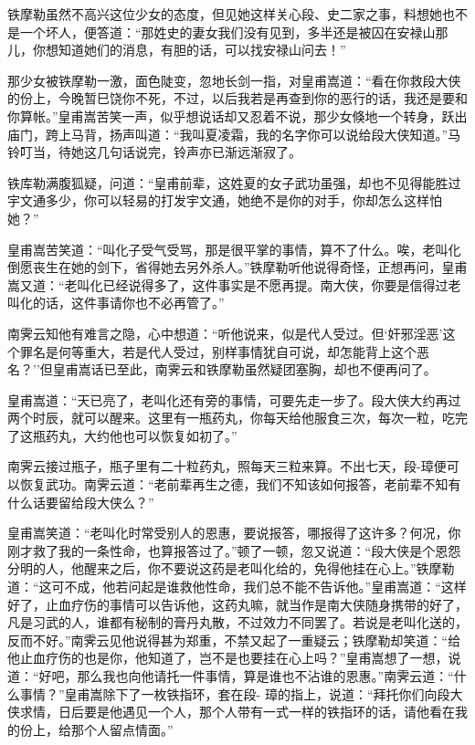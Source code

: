 \documentclass[12pt,oneside]{book}
\begin{document}
铁摩勒虽然不高兴这位少女的态度，但见她这样关心段、史二家之事，料想她也不是一个坏人，便答道：``那姓史的妻女我们没有见到，多半还是被囚在安禄山那儿，你想知道她们的消息，有胆的话，可以找安禄山问去！''

那少女被铁摩勒一激，面色陡变，忽地长剑一指，对皇甫嵩道：``看在你救段大侠的份上，今晚暂巳饶你不死，不过，以后我若是再查到你的恶行的话，我还是要和你算帐。''皇甫嵩苦笑一声，似乎想说话却又忍着不说，那少女倏地一个转身，跃出庙门，跨上马背，扬声叫道：``我叫夏凌霜，我的名字你可以说给段大侠知道。''马铃叮当，待她这几句话说完，铃声亦已渐远渐寂了。

铁库勒满腹狐疑，问道：``皇甫前辈，这姓夏的女子武功虽强，却也不见得能胜过宇文通多少，你可以轻易的打发宇文通，她绝不是你的对手，你却怎么这样怕她？''

皇甫嵩苦笑道：``叫化子受气受骂，那是很平掌的事情，算不了什么。唉，老叫化倒愿丧生在她的剑下，省得她去另外杀人。''铁摩勒听他说得奇怪，正想再问，皇甫嵩又道：``老叫化已经说得多了，这件事实是不愿再提。南大侠，你要是信得过老叫化的话，这件事请你也不必再管了。''

南霁云知他有难言之隐，心中想道：``听他说来，似是代人受过。但`奸邪淫恶'这个罪名是何等重大，若是代人受过，别样事情犹自可说，却怎能背上这个恶名？''但皇甫嵩话已至此，南霁云和铁摩勒虽然疑团塞胸，却也不便再问了。

皇甫嵩道：``天已亮了，老叫化还有旁的事情，可要先走一步了。段大侠大约再过两个时辰，就可以醒来。这里有一瓶药丸，你每天给他服食三次，每次一粒，吃完了这瓶药丸，大约他也可以恢复如初了。''

南霁云接过瓶子，瓶子里有二十粒药丸，照每天三粒来算。不出七天，段-璋便可以恢复武功。南霁云道：``老前辈再生之德，我们不知该如何报答，老前辈不知有什么话要留给段大侠么？''

皇甫嵩笑道：``老叫化时常受别人的恩惠，要说报答，哪报得了这许多？何况，你刚才救了我的一条性命，也算报答过了。''顿了一顿，忽又说道：``段大侠是个恩怨分明的人，他醒来之后，你不要说这药是老叫化给的，免得他挂在心上。''铁摩勒道：``这可不成，他若问起是谁救他性命，我们总不能不告诉他。''皇甫嵩道：``这样好了，止血疗伤的事情可以告诉他，这药丸嘛，就当作是南大侠随身携带的好了，凡是习武的人，谁都有秘制的膏丹丸散，不过效力不同罢了。若说是老叫化送的，反而不好。''南霁云见他说得甚为郑重，不禁又起了一重疑云；铁摩勒却笑道：``给他止血疗伤的也是你，他知道了，岂不是也要挂在心上吗？''皇甫嵩想了一想，说道：``好吧，那么我也向他请托一件事情，算是谁也不沾谁的恩惠。''南霁云道：``什么事情？''皇甫嵩除下了一枚铁指环，套在段-
璋的指上，说道：``拜托你们向段大侠求情，日后要是他遇见一个人，那个人带有一式一样的铁指环的话，请他看在我的份上，给那个人留点情面。''
\end{document}
